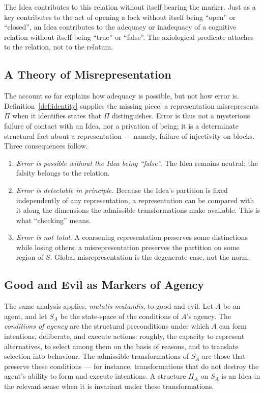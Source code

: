 \documentclass[11pt,a4paper]{article}
\theoremstyle{definition}
\theoremstyle{remark}
\begin{document}
The Idea contributes to this relation without itself bearing the
marker. Just as a key contributes to the act of opening a lock without
itself being ``open'' or ``closed'', an Idea contributes to the
adequacy or inadequacy of a cognitive relation without itself being
``true'' or ``false''. The axiological predicate attaches to the
relation, not to the relatum.

\subsection{A Theory of Misrepresentation}\label{sec:misrep}

The account so far explains how adequacy is possible, but not how
error is. Definition~\ref{def:identity} supplies the missing piece: a
representation misrepresents $\Pi$ when it identifies states that
$\Pi$ distinguishes. Error is thus not a mysterious failure of contact
with an Idea, nor a privation of being; it is a determinate structural
fact about a representation --- namely, failure of injectivity on
blocks. Three consequences follow.

\begin{enumerate}[label=(\alph*),nosep]
  \item \emph{Error is possible without the Idea being ``false''.} The
        Idea remains neutral; the falsity belongs to the relation.
  \item \emph{Error is detectable in principle.} Because the Idea's
        partition is fixed independently of any representation, a
        representation can be compared with it along the dimensions
        the admissible transformations make available. This is what
        ``checking'' means.
  \item \emph{Error is not total.} A coarsening representation
        preserves some distinctions while losing others; a
        misrepresentation preserves the partition on some region of
        $S$. Global misrepresentation is the degenerate case, not the
        norm.
\end{enumerate}

\subsection{Good and Evil as Markers of Agency}\label{sec:good}

The same analysis applies, \emph{mutatis mutandis}, to good and evil.
Let $A$ be an agent, and let $S_A$ be the state-space of the
conditions of $A$'s agency. The \emph{conditions of agency} are the
structural preconditions under which $A$ can form intentions,
deliberate, and execute actions: roughly, the capacity to represent
alternatives, to select among them on the basis of reasons, and to
translate selection into behaviour. The admissible transformations of
$S_A$ are those that preserve these conditions --- for instance,
transformations that do not destroy the agent's ability to form and
execute intentions. A structure $\Pi_A$ on $S_A$ is an Idea in the
relevant sense when it is invariant under these transformations.
\end{document}
